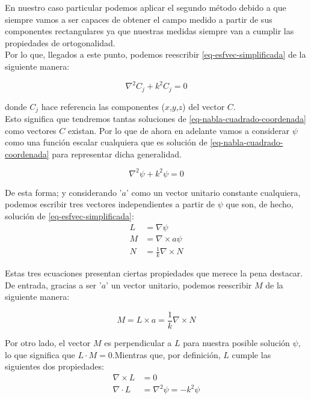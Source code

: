 \documentclass{article}
\begin{document}
En nuestro caso particular podemos aplicar el segundo método debido a que siempre vamos a ser capaces de obtener el campo medido a partir de sus componentes rectangulares ya que nuestras medidas siempre van a cumplir las propiedades de ortogonalidad.\\
Por lo que, llegados a este punto, podemos reescribir \eqref{eq-esfvec-simplificada} de la siguiente manera:

\begin{equation}
\nabla^2C_{j} + k^2C_{j} = 0
\label{eq-nabla-cuadrado-coordenada}
\end{equation}

donde $C_{j}$ hace referencia las componentes ($x$,$y$,$z$) del vector $C$.
\\

Esto significa que tendremos tantas soluciones de \eqref{eq-nabla-cuadrado-coordenada} como vectores $C$ existan. Por lo que de ahora en adelante vamos a considerar $\psi$ como una función escalar cualquiera que es solución de \eqref{eq-nabla-cuadrado-coordenada} para representar dicha generalidad.

\begin{equation}
\nabla^2\psi + k^2\psi = 0
\label{eq-nabla-cuadrado-coordenada-con-una-soculicon-por-vector-C}
\end{equation}

De esta forma; y considerando  '$a$' como un vector unitario constante cualquiera, podemos escribir tres vectores independientes a partir de $\psi$ que son, de hecho, solución de \eqref{eq-esfvec-simplificada}:
\begin{subequations}
\begin{align}
    L&= \nabla\psi \label{eq:Lirrotacional}\\
    M&= \nabla\times a\psi\\
    N&=\frac{1}{k}\nabla\times N
\end{align}
\end{subequations}

Estas tres ecuaciones presentan ciertas propiedades que merece la pena destacar. De entrada, gracias a ser '$a$' un vector unitario, podemos reescribir $M$ de la siguiente manera:    

\begin{equation}
M= L \times a = \frac{1}{k}\nabla \times N
\label{eq-M-reescrito}
\end{equation}

\newpage

Por otro lado, el vector $M$ es perpendicular a $L$ para nuestra posible solución $\psi$, lo que significa que $L\cdot M=0$.Mientras que, por definición, $L$ cumple las siguientes dos propiedades:
\begin{align}
    \nabla  \times L &=0 \\
    \nabla  \cdot L  &=\nabla^2\psi = -k^2 \psi
\end{align}
\end{document}

